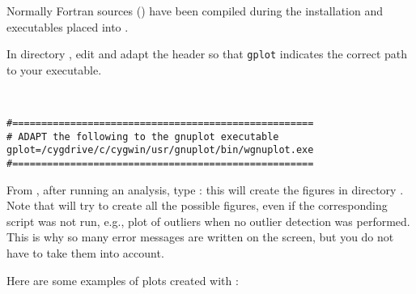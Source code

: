 Normally Fortran sources () have been compiled during the \diva installation and executables placed into .

In directory , edit   and adapt the header so that  \texttt{gplot} indicates the correct path to your \gnuplot executable.

\example\\
\begin{verbatim}
#====================================================
# ADAPT the following to the gnuplot executable
gplot=/cygdrive/c/cygwin/usr/gnuplot/bin/wgnuplot.exe
#====================================================
\end{verbatim}

From , after running an analysis, type : this will create the figures in directory .
Note that  will try to create all the possible figures, even if the corresponding script was not run, e.g., plot of outliers when no outlier detection was performed. This is why so many error messages are written on the screen, but you do not have to take them into account.

%

Here are some examples of plots created with \gnuplot:

